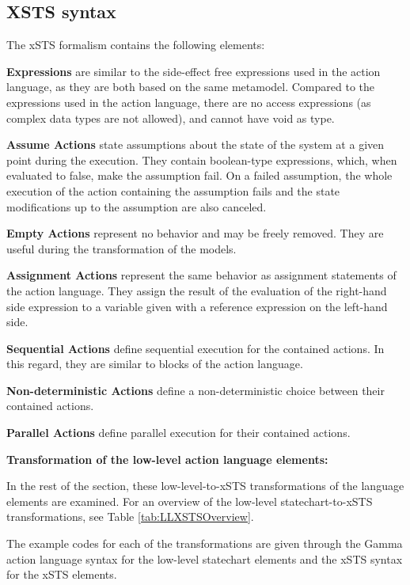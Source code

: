 \subsection{XSTS syntax}
The xSTS formalism contains the following elements:

\textbf{Expressions} are similar to the side-effect free expressions used in the action language, as they are both based on the same metamodel. Compared to the expressions used in the action language, there are no access expressions (as complex data types are not allowed), and cannot have void as type.

\textbf{Assume Actions} state assumptions about the state of the system at a given point during the execution. They contain boolean-type expressions, which, when evaluated to false, make the assumption fail. On a failed assumption, the whole execution of the action containing the assumption fails and the state modifications up to the assumption are also canceled.

\textbf{Empty Actions} represent no behavior and may be freely removed. They are useful during the transformation of the models.

\textbf{Assignment Actions} represent the same behavior as assignment statements of the action language. They assign the result of the evaluation of the right-hand side expression to a variable given with a reference expression on the left-hand side.

\textbf{Sequential Actions} define sequential execution for the contained actions. In this regard, they are similar to blocks of the action language.

\textbf{Non-deterministic Actions} define a non-deterministic choice between their contained actions. 

\textbf{Parallel Actions} define parallel execution for their contained actions.

\bigskip
\textbf{Transformation of the low-level action language elements:}

In the rest of the section, these low-level-to-xSTS transformations of the language elements are examined. For an overview of the low-level statechart-to-xSTS transformations, see Table \ref{tab:LLXSTSOverview}. 

The example codes for each of the transformations are given through the Gamma action language syntax for the low-level statechart elements and the xSTS syntax for the xSTS elements.

